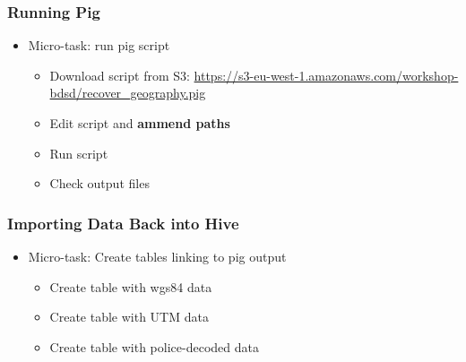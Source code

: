 \documentclass[hyperref={pdfpagelabels=true}]{beamer}
\begin{document}
\begin{frame}
\frametitle{Running Pig}
\begin{itemize}
  \item<1->Micro-task: run pig script
  \begin{itemize}
    \item<2->Download script from S3: \url{https://s3-eu-west-1.amazonaws.com/workshop-bdsd/recover_geography.pig}
    \item<3->Edit script and \textbf{ammend paths}
    \item<4->Run script    
    \item<5->Check output files
  \end{itemize}
\end{itemize}
\end{frame}

\begin{frame}
\frametitle{Importing Data Back into Hive}
\begin{itemize}
  \item<1->Micro-task: Create tables linking to pig output
  \begin{itemize}
    \item<2->Create table with wgs84 data
    \item<2->Create table with UTM data
    \item<2->Create table with police-decoded data
  \end{itemize}
\end{itemize}
\end{frame}
\end{document}
